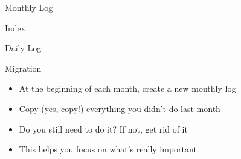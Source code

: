 \documentclass[aspectratio=169]{beamer}
\begin{document}
    {
    \begin{frame}{Monthly Log}
    \end{frame}
    }

    {
    \begin{frame}{Index}
    \end{frame}
    }

    {
    \begin{frame}{Daily Log}
    \end{frame}
    }

    {
    \begin{frame}{Migration}
        \begin{itemize}
            \item At the beginning of each month, create a new monthly log
            \item Copy (yes, \alert{copy}!) everything you didn't do last month
            \item Do you still need to do it? If not, get rid of it
            \item This helps you focus on what's \alert{really} important
        \end{itemize}
    \end{frame}
    }
\end{document}
